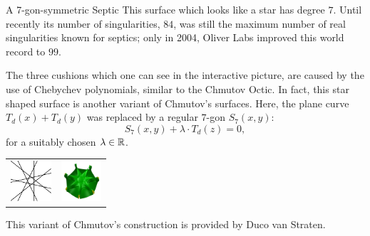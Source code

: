 \begin{surferPage}{A 7-gon-symmetric Septic}
    This surface which looks like a star has degree $7$.  
    Until recently its number of singularities, $84$, was still the
    maximum number of real singularities known for septics;
    only in 2004, Oliver Labs improved this world record to $99$.
  
  
 The three cushions which one can see in the interactive picture, 
    are caused by the use of Chebychev polynomials, similar to the Chmutov
    Octic. 
    In fact, this star shaped surface is another variant of Chmutov's surfaces.
    Here, the plane curve $T_d(x)+T_d(y)$ was replaced by a regular $7$-gon
    $S_7(x,y)$: 
   \[S_7(x,y) + \lambda \cdot T_d(z) = 0,\]
    for a suitably chosen $\lambda\in{\mathbb R}$. 
    \vspace*{-0.3em}
    \begin{center}
      \begin{tabular}{c@{\qquad}c}
        \includegraphics[height=1.5cm]{./../../common/images/labsseptic1.pdf}
        &
        \includegraphics[height=1.5cm]{./../../common/images/septic_7eck_von_oben}
      \end{tabular}
    \end{center}
    \vspace*{-0.3em}   
   This variant of Chmutov's construction is provided by Duco van Straten.
\end{surferPage}

